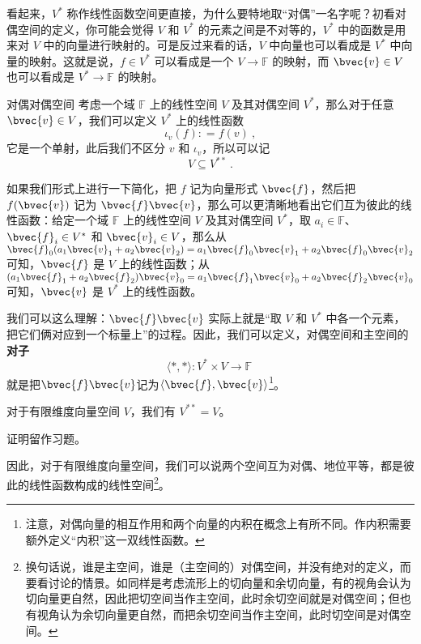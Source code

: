 看起来，$V^*$ 称作线性函数空间更直接，为什么要特地取“对偶”一名字呢？初看对偶空间的定义，你可能会觉得 $V$ 和 $V^*$ 的元素之间是不对等的，$V^*$ 中的函数是用来对 $V$ 中的向量进行映射的。可是反过来看的话，$V$ 中向量也可以看成是 $V^*$ 中向量的映射。这就是说，$f\in V^*$ 可以看成是一个 $V\rightarrow\mathbb{F}$ 的映射，而 $\bvec{v}\in V$ 也可以看成是 $V^*\rightarrow\mathbb{F}$ 的映射。

\begin{theorem}{对偶对偶空间}\label{the_DualSp_3}
考虑一个域 $\mathbb{F}$ 上的线性空间 $V$ 及其对偶空间 $V^*$，那么对于任意 $\bvec{v} \in V$，我们可以定义 $V^*$ 上的线性函数
\begin{equation}
\iota_v(f): = f(v)~,
\end{equation}
它是一个单射，此后我们不区分 $v$ 和 $\iota_v$，所以可以记
\begin{equation}
V \subseteq V^{**}~.
\end{equation}
\end{theorem}

如果我们形式上进行一下简化，把 $f$ 记为向量形式 $\bvec{f}$，然后把 $f(\bvec{v})$ 记为 $\bvec{f}\bvec{v}$，那么可以更清晰地看出它们互为彼此的线性函数：给定一个域 $\mathbb{F}$ 上的线性空间 $V$ 及其对偶空间 $V^*$，取 $a_i\in\mathbb{F}$、$\bvec{f}_i\in V^*$ 和 $\bvec{v}_i\in V$，那么从 $\bvec{f}_0(a_1\bvec{v}_1+a_2\bvec{v}_2)=a_1\bvec{f}_0\bvec{v}_1+a_2\bvec{f}_0\bvec{v}_2$ 可知，$\bvec{f}$ 是 $V$ 上的线性函数；从 $(a_1\bvec{f}_1+a_2\bvec{f}_2)\bvec{v}_0=a_1\bvec{f}_1\bvec{v}_0+a_2\bvec{f}_2\bvec{v}_0$ 可知，$\bvec{v}$ 是 $V^*$ 上的线性函数。

我们可以这么理解：$\bvec{f}\bvec{v}$ 实际上就是“取 $V$ 和 $V^*$ 中各一个元素，把它们俩对应到一个标量上”的过程。因此，我们可以定义，对偶空间和主空间的\textbf{对子}
\begin{equation}
\langle *, * \rangle: V^* \times V \to \mathbb{F}~
\end{equation}
就是把$\bvec{f}\bvec{v}$记为$\langle \bvec{f}, \bvec{v} \rangle$\footnote{注意，对偶向量的相互作用和两个向量的内积在概念上有所不同。作内积需要额外定义“内积”这一双线性函数。}。

\begin{theorem}{}\label{the_DualSp_4}
对于有限维度向量空间 $V$，我们有 $V^{**} = V$。
\end{theorem}
证明留作习题。

因此，对于有限维度向量空间，我们可以说两个空间互为对偶、地位平等，都是彼此的线性函数构成的线性空间\footnote{换句话说，谁是主空间，谁是（主空间的）对偶空间，并没有绝对的定义，而要看讨论的情景。如同样是考虑流形上的切向量和余切向量，有的视角会认为切向量更自然，因此把切空间当作主空间，此时余切空间就是对偶空间；但也有视角认为余切向量更自然，而把余切空间当作主空间，此时切空间是对偶空间。}。


